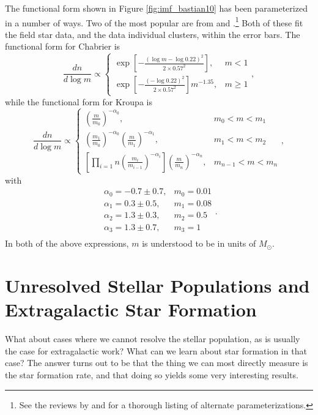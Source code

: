 The functional form shown in Figure \ref{fig:imf_bastian10} has been parameterized in a number of ways. Two of the most popular are from \citet{kroupa01a, kroupa02c} and \citet{chabrier03a, chabrier05a}.\footnote{See the reviews by \citet{bastian10a} and \citet{offner14a} for a thorough listing of alternate parameterizations.}  Both of these fit the field star data, and the data individual clusters, within the error bars. The functional form for Chabrier is
\begin{equation}
\label{eq:chabrier}
\frac{dn}{d\log m} \propto 
\left\{
\begin{array}{ll}
\exp\left[-\frac{(\log m-\log 0.22)^2}{2\times 0.57^2}\right], &
m<1 \\
\exp\left[-\frac{(-\log 0.22)^2}{2\times 0.57^2}\right] m^{-1.35}, &
m\ge 1
\end{array}
\right.,
\end{equation}
while the functional form for Kroupa is
\begin{equation}
\label{eq:kroupa}
\frac{dn}{d\log m} \propto
\left\{
\begin{array}{ll}
\left(\frac{m}{m_0}\right)^{-\alpha_0}, & m_0 < m < m_1\\
\left(\frac{m_1}{m_0}\right)^{-\alpha_0} \left(\frac{m}{m_1}\right)^{-\alpha_1}, &
m_1 < m < m_2 \\
\left[\prod_{i=1}{n} \left(\frac{m_i}{m_{i-1}}\right)^{-\alpha_i}\right] \left(\frac{m}{m_n}\right)^{-\alpha_n}, &
m_{n-1} < m < m_n
\end{array}
\right.,
\end{equation}
with
\begin{equation}
\begin{array}{ll}
\alpha_0 = -0.7\pm 0.7, & m_0 = 0.01 \\
\alpha_1 = 0.3\pm 0.5, & m_1 = 0.08 \\
\alpha_2 = 1.3\pm 0.3, & m_2 = 0.5 \\
\alpha_3 = 1.3\pm 0.7, & m_3 = 1 \\
\end{array}.
\end{equation}
In both of the above expressions, $m$ is understood to be in units of $M_\odot$.

\section{Unresolved Stellar Populations and Extragalactic Star Formation}

What about cases where we cannot resolve the stellar population, as is usually the case for extragalactic work? What can we learn about star formation in that case? The answer turns out to be that the thing we can most directly measure is the star formation rate, and that doing so yields some very interesting results.

